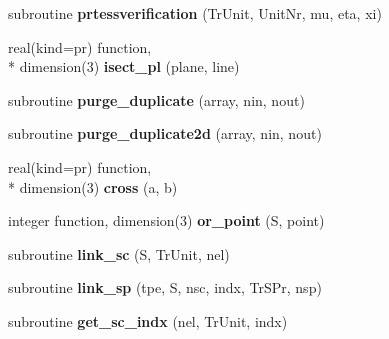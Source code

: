\begin{DoxyCompactItemize}
\item 
\hypertarget{classtracking__routines_a2737eff6fc3d1e167bf06479e40a49e5}{subroutine {\bfseries prtessverification} (Tr\+Unit, Unit\+Nr, mu, eta, xi)}\label{classtracking__routines_a2737eff6fc3d1e167bf06479e40a49e5}

\item 
\hypertarget{classtracking__routines_a4a27df4391e12cb707ca533509795103}{real(kind=pr) function, \\*
dimension(3) {\bfseries isect\+\_\+pl} (plane, line)}\label{classtracking__routines_a4a27df4391e12cb707ca533509795103}

\item 
\hypertarget{classtracking__routines_aae681a6b8f4dbb6e05dbdc58c4f94019}{subroutine {\bfseries purge\+\_\+duplicate} (array, nin, nout)}\label{classtracking__routines_aae681a6b8f4dbb6e05dbdc58c4f94019}

\item 
\hypertarget{classtracking__routines_aad61af40384e51ae6b40895548de50cf}{subroutine {\bfseries purge\+\_\+duplicate2d} (array, nin, nout)}\label{classtracking__routines_aad61af40384e51ae6b40895548de50cf}

\item 
\hypertarget{classtracking__routines_af1c33e001b61da5d7a3e2f56704adb75}{real(kind=pr) function, \\*
dimension(3) {\bfseries cross} (a, b)}\label{classtracking__routines_af1c33e001b61da5d7a3e2f56704adb75}

\item 
\hypertarget{classtracking__routines_a14768dcbd966ad63cfd8da92488509f6}{integer function, dimension(3) {\bfseries or\+\_\+point} (S, point)}\label{classtracking__routines_a14768dcbd966ad63cfd8da92488509f6}

\item 
\hypertarget{classtracking__routines_af775b6bb9ab67c4bafde342e76e575ee}{subroutine {\bfseries link\+\_\+sc} (S, Tr\+Unit, nel)}\label{classtracking__routines_af775b6bb9ab67c4bafde342e76e575ee}

\item 
\hypertarget{classtracking__routines_a205cbbd3b4519291d9e37ea96ab438af}{subroutine {\bfseries link\+\_\+sp} (tpe, S, nsc, indx, Tr\+S\+Pr, nsp)}\label{classtracking__routines_a205cbbd3b4519291d9e37ea96ab438af}

\item 
\hypertarget{classtracking__routines_acd2c9c52f513ee8a9d1a43f98a4ab23f}{subroutine {\bfseries get\+\_\+sc\+\_\+indx} (nel, Tr\+Unit, indx)}\label{classtracking__routines_acd2c9c52f513ee8a9d1a43f98a4ab23f}


\end{DoxyCompactItemize}
